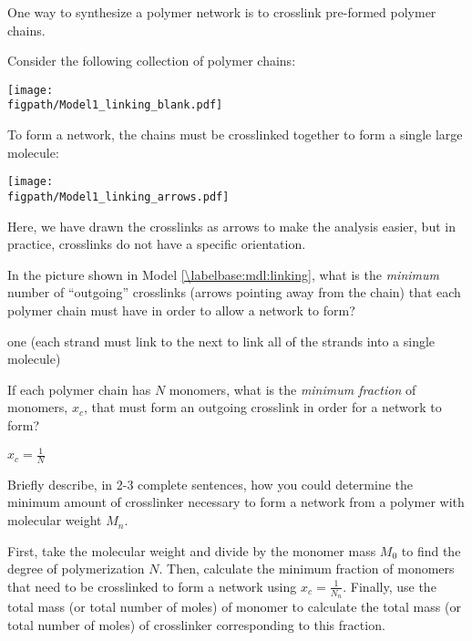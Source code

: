 \begin{activity}
\begin{instructornotes}
\end{instructornotes}


\begin{model}
	\label{\labelbase:mdl:linking}

	One way to synthesize a polymer network is to crosslink pre-formed polymer chains.
	
	Consider the following collection of polymer chains:
	
	\centerline{\texttt{[image: \\figpath/Model1\_linking\_blank.pdf]}}
	
	To form a network, the chains must be crosslinked together to form a single large molecule:
	
	\centerline{\texttt{[image: \\figpath/Model1\_linking\_arrows.pdf]}}
	
	Here, we have drawn the crosslinks as arrows to make the analysis easier, but in practice, crosslinks do not have a specific orientation.
	
\end{model}


\begin{ctqs}

	\question In the picture shown in Model \ref{\labelbase:mdl:linking}, what is the \emph{minimum} number of ``outgoing'' crosslinks (arrows pointing away from the chain) that each polymer chain must have in order to allow a network to form?
	
		\begin{solution}[0.5in]
		
			one (each strand must link to the next to link all of the strands into a single molecule)
			
		\end{solution}
		
	\question If each polymer chain has $N$ monomers, what is the \emph{minimum fraction} of monomers, $x_c$, that must form an outgoing crosslink in order for a network to form?
	
		\begin{solution}[0.5in]
			$x_c = \frac{1}{N}$
		\end{solution}
		
	\question Briefly describe, in 2-3 complete sentences, how you could determine the minimum amount of crosslinker necessary to form a network from a polymer with molecular weight $M_n$.
	
		\begin{solution}[2in]
			First, take the molecular weight and divide by the monomer mass $M_0$ to find the degree of polymerization $N$.  Then, calculate the minimum fraction of monomers that need to be crosslinked to form a network using $x_c = \frac{1}{N_n}$.  Finally, use the total mass (or total number of moles) of monomer to calculate the total mass (or total number of moles) of crosslinker corresponding to this fraction.
		\end{solution}
		

\end{ctqs}
\end{activity}
